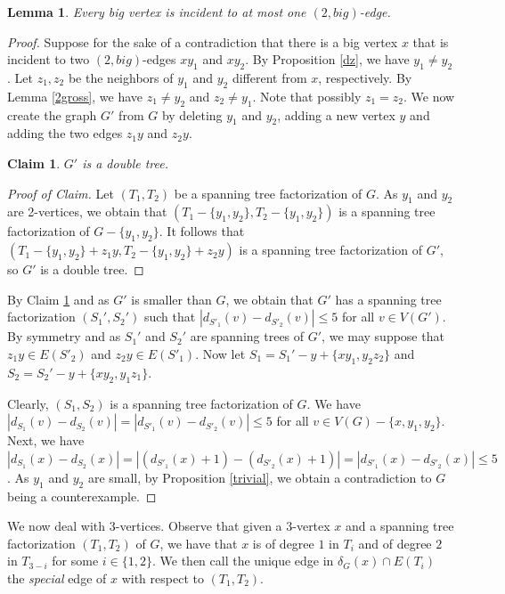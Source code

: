 \documentclass{article}
\theoremstyle{plain}
\newtheorem{Lemma}{Lemma}
\newtheorem{Claim}{Claim}
\theoremstyle{nonumberplain}
\theoremstyle{nonumberplain}
\newcommand{\stf}{spanning tree factorization }
\begin{document}
\begin{Lemma}\label{only}
Every big vertex is incident to at most one $(2,big)$-edge.
\end{Lemma}
\begin{proof}
Suppose for the sake of a contradiction that there is a big vertex $x$ that is incident to two $(2,big)$-edges $xy_1$ and $xy_2$. By Proposition \ref{dz}, we have $y_1 \neq y_2$. Let $z_1,z_2$  be the neighbors of $y_1$ and $y_2$ different from $x$, respectively. By Lemma \ref{2gross}, we have $z_1 \neq y_2$ and $z_2 \neq y_1$. Note that possibly $z_1=z_2$. We now create the graph $G'$ from $G$ by deleting $y_1$ and $y_2$, adding a new vertex $y$ and adding the two edges $z_1y$ and $z_2y$. 
\begin{Claim}\label{2t}
$G'$ is a double tree.
\end{Claim}
\begin{proof}[Proof of Claim]
Let $(T_1,T_2)$ be a \stf of $G$. As $y_1$ and $y_2$ are 2-vertices, we obtain that $(T_1-\{y_1,y_2\}, T_2-\{y_1,y_2\})$ is a \stf of $G-\{y_1,y_2\}$. It follows that $(T_1-\{y_1,y_2\}+z_1y, T_2-\{y_1,y_2\}+z_2y)$ is a \stf of $G'$, so $G'$ is a double tree.
\renewcommand{\qedsymbol}{$\blacksquare$}
\end{proof}
By Claim \ref{2t} and as $G'$ is smaller than $G$,  we obtain that $G'$ has a \stf $(S_1',S_2')$ such that $|d_{S'_1}(v)-d_{S'_2}(v)|\leq 5$ for all $v \in V(G')$. By symmetry and as $S_1'$ and $S_2'$ are spanning trees of $G'$, we may suppose that $z_1y \in E(S'_2)$ and $z_2y \in E(S'_1)$. Now let $S_1=S_1'-y+\{xy_1,y_2z_2\}$ and $S_2=S_2'-y+\{xy_2,y_1z_1\}$.

 Clearly, $(S_1,S_2)$ is a \stf of $G$. We have $|d_{S_1}(v)-d_{S_2}(v)|=|d_{S'_1}(v)-d_{S'_2}(v)|\leq 5$ for all $v \in V(G)-\{x,y_1,y_2\}$. Next, we have $|d_{S_1}(x)-d_{S_2}(x)|=|(d_{S'_1}(x)+1)-(d_{S'_2}(x)+1)|=|d_{S'_1}(x)-d_{S'_2}(x)|\leq 5$. As $y_1$ and $y_2$ are small, by Proposition \ref{trivial}, we obtain a contradiction to $G$ being a counterexample.
\end{proof}

We now deal with 3-vertices. Observe that given a 3-vertex $x$ and a \stf $(T_1,T_2)$ of $G$, we have that $x$ is of degree $1$ in $T_i$ and of degree $2$ in $T_{3-i}$ for some $i \in \{1,2\}$. We then call the unique edge in $\delta_G(x)\cap E(T_i)$ the {\it special} edge of $x$ with respect to $(T_1,T_2)$.
\end{document}
